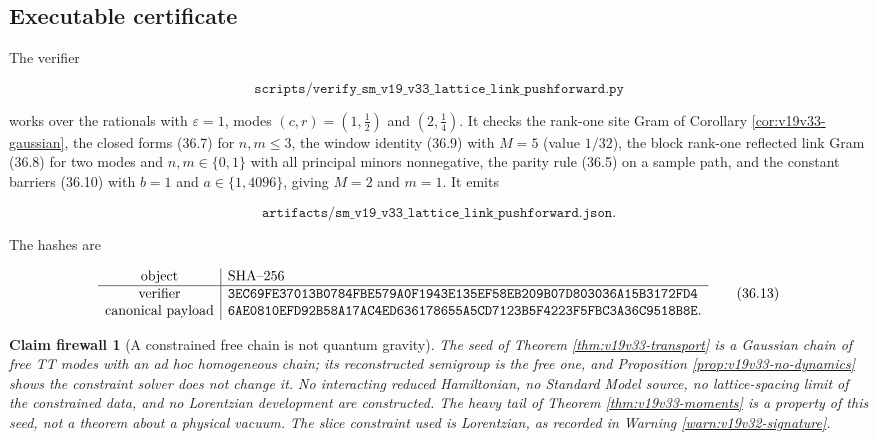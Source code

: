 \documentclass[11pt]{article}
\newtheorem{firewall}[theorem]{Claim firewall}
\theoremstyle{remark}
\begin{document}
\subsection{Executable certificate}

The verifier

\[
 \texttt{scripts/verify\_sm\_v19\_v33\_lattice\_link\_pushforward.py}
                                                                    \tag{36.11}
\]

works over the rationals with \(\varepsilon=1\), modes
\((c,r)=(1,\tfrac12)\) and \((2,\tfrac14)\).  It checks the rank-one
site Gram of Corollary \ref{cor:v19v33-gaussian}, the closed forms
(36.7) for \(n,m\leq3\), the window identity (36.9) with \(M=5\)
(value \(1/32\)), the block rank-one reflected link Gram (36.8) for two
modes and \(n,m\in\{0,1\}\) with all principal minors nonnegative, the
parity rule (36.5) on a sample path, and the constant barriers (36.10)
with \(b=1\) and \(a\in\{1,4096\}\), giving \(M=2\) and \(m=1\).  It
emits

\[
 \texttt{artifacts/sm\_v19\_v33\_lattice\_link\_pushforward.json}.
                                                                    \tag{36.12}
\]

The hashes are

\[
\begin{array}{c|l}
\hbox{object}&\hbox{SHA--256}\\ \hline
\hbox{verifier}&
\texttt{3EC69FE37013B0784FBE579A0F1943E135EF58EB209B07D803036A15B3172FD4}\\
\hbox{canonical payload}&
\texttt{6AE0810EFD92B58A17AC4ED636178655A5CD7123B5F4223F5FBC3A36C9518B8E}.
\end{array}                                                     \tag{36.13}
\]

\begin{firewall}[A constrained free chain is not quantum gravity]
\label{fire:v19v33}
The seed of Theorem \ref{thm:v19v33-transport} is a Gaussian chain of
free TT modes with an ad hoc homogeneous chain; its reconstructed
semigroup is the free one, and Proposition
\ref{prop:v19v33-no-dynamics} shows the constraint solver does not
change it.  No interacting reduced Hamiltonian, no Standard Model
source, no lattice-spacing limit of the constrained data, and no
Lorentzian development are constructed.  The heavy tail of Theorem
\ref{thm:v19v33-moments} is a property of this seed, not a theorem
about a physical vacuum.  The slice constraint used is Lorentzian, as
recorded in Warning \ref{warn:v19v32-signature}.
\end{firewall}
\end{document}

